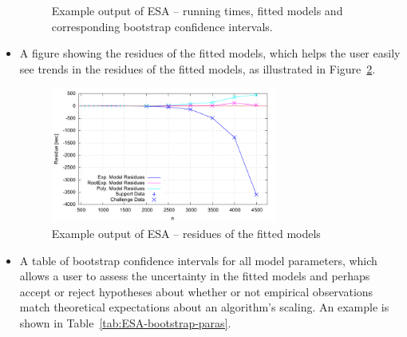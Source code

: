 \documentclass[aic]{iosart2x}
\begin{document}
\begin{itemize}
\begin{figure}[t]
\caption{Example output of ESA -- running times, fitted models and corresponding bootstrap confidence intervals.}\label{fig:ESA-fitted-models}
\end{figure}

\item A figure showing the residues of the fitted models, which helps the user easily see trends in the residues of the fitted models, as illustrated in Figure~\ref{fig:ESA-fitted-residues}.
\begin{figure}[t]
\noindent \begin{centering}
\includegraphics[width=0.7\textwidth]{EAX_fittedResidues} \vspace{-5mm}

\par\end{centering}

\caption{Example output of ESA -- residues of the fitted models}\label{fig:ESA-fitted-residues}
\end{figure}


\item A table of bootstrap confidence intervals for all model parameters, which allows a user to assess the uncertainty in the fitted models and perhaps accept or reject hypotheses about whether or not empirical observations match theoretical expectations about an algorithm's scaling. An example is shown in Table~\ref{tab:ESA-bootstrap-paras}.
\begin{table}[t]
\begin{centering}
\caption{\label{tab:ESA-bootstrap-paras}Model confidence intervals example}
\medskip{}


\end{centering}
\end{table}
\end{itemize}
\end{document}
